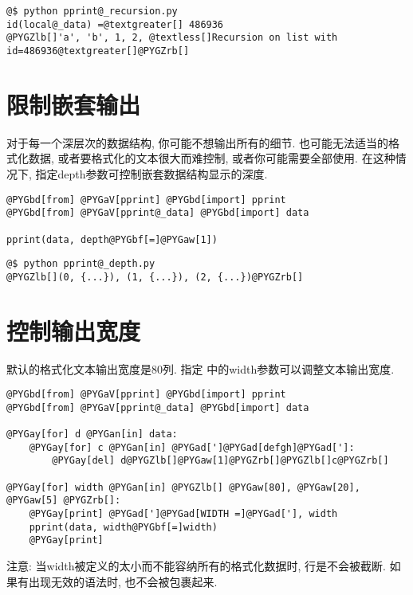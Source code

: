 \documentclass[a4paper,10pt,english]{manual}
\begin{document}
\begin{Verbatim}[commandchars=@\[\]]
@$ python pprint@_recursion.py
id(local@_data) =@textgreater[] 486936
@PYGZlb[]'a', 'b', 1, 2, @textless[]Recursion on list with id=486936@textgreater[]@PYGZrb[]
\end{Verbatim}


\section{限制嵌套输出}

对于每一个深层次的数据结构, 你可能不想输出所有的细节. 也可能无法适当的格式化数据, 或者要格式化的文本很大而难控制, 或者你可能需要全部使用. 在这种情况下, 指定depth参数可控制嵌套数据结构显示的深度.

\begin{Verbatim}[commandchars=@\[\]]
@PYGbd[from] @PYGaV[pprint] @PYGbd[import] pprint
@PYGbd[from] @PYGaV[pprint@_data] @PYGbd[import] data

pprint(data, depth@PYGbf[=]@PYGaw[1])
\end{Verbatim}

\begin{Verbatim}[commandchars=@\[\]]
@$ python pprint@_depth.py
@PYGZlb[](0, {...}), (1, {...}), (2, {...})@PYGZrb[]
\end{Verbatim}


\section{控制输出宽度}

默认的格式化文本输出宽度是80列. 指定  中的width参数可以调整文本输出宽度.

\begin{Verbatim}[commandchars=@\[\]]
@PYGbd[from] @PYGaV[pprint] @PYGbd[import] pprint
@PYGbd[from] @PYGaV[pprint@_data] @PYGbd[import] data

@PYGay[for] d @PYGan[in] data:
    @PYGay[for] c @PYGan[in] @PYGad[']@PYGad[defgh]@PYGad[']:
        @PYGay[del] d@PYGZlb[]@PYGaw[1]@PYGZrb[]@PYGZlb[]c@PYGZrb[]

@PYGay[for] width @PYGan[in] @PYGZlb[] @PYGaw[80], @PYGaw[20], @PYGaw[5] @PYGZrb[]:
    @PYGay[print] @PYGad[']@PYGad[WIDTH =]@PYGad['], width
    pprint(data, width@PYGbf[=]width)
    @PYGay[print]
\end{Verbatim}

注意: 当width被定义的太小而不能容纳所有的格式化数据时, 行是不会被截断. 如果有出现无效的语法时, 也不会被包裹起来.
\end{document}

